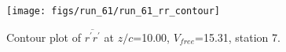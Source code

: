 \begin{figure}[H]
\centering
\texttt{[image: figs/run\_61/run\_61\_rr\_contour]}
\caption{Contour plot of $\overline{r^\prime r^\prime}$ at $z/c$=10.00, $V_{free}$=15.31, station 7.}
\label{fig:run_61_rr_contour}
\end{figure}


